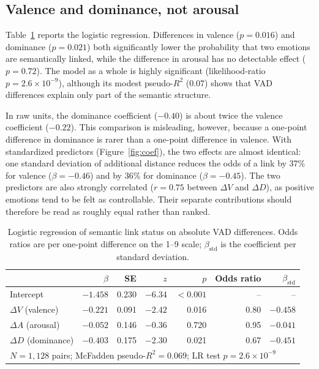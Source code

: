 \documentclass[11pt,a4paper]{article}
\newcommand{\dV}{\Delta V}
\newcommand{\dA}{\Delta A}
\newcommand{\dD}{\Delta D}
\begin{document}
\subsection{Valence and dominance, not arousal}

Table~\ref{tab:logit} reports the logistic regression. Differences in
valence ($p = 0.016$) and dominance ($p = 0.021$) both significantly lower
the probability that two emotions are semantically linked, while the
difference in arousal has no detectable effect ($p = 0.72$). The model as a
whole is highly significant (likelihood-ratio $p = 2.6 \times 10^{-9}$),
although its modest pseudo-$R^2$ (0.07) shows that VAD differences explain
only part of the semantic structure.

In raw units, the dominance coefficient ($-0.40$) is about twice the valence
coefficient ($-0.22$). This comparison is misleading, however, because a
one-point difference in dominance is rarer than a one-point difference in
valence. With standardized predictors (Figure~\ref{fig:coef}), the two
effects are almost identical: one standard deviation of additional distance
reduces the odds of a link by 37\% for valence ($\beta = -0.46$) and by
36\% for dominance ($\beta = -0.45$). The two predictors are also strongly
correlated ($r = 0.75$ between $\dV$ and $\dD$), as positive emotions tend to
be felt as controllable. Their separate contributions should therefore be
read as roughly equal rather than ranked.

\begin{table}[h]
  \centering
  \small
  \begin{tabular}{lrrrrrr}
    \toprule
    & $\beta$ & SE & $z$ & $p$ & Odds ratio & $\beta_{\text{std}}$ \\
    \midrule
    Intercept         & $-1.458$ & 0.230 & $-6.34$ & $<0.001$ & --    & --        \\
    $\dV$ (valence)   & $-0.221$ & 0.091 & $-2.42$ & 0.016    & 0.80  & $-0.458$  \\
    $\dA$ (arousal)   & $-0.052$ & 0.146 & $-0.36$ & 0.720    & 0.95  & $-0.041$  \\
    $\dD$ (dominance) & $-0.403$ & 0.175 & $-2.30$ & 0.021    & 0.67  & $-0.451$  \\
    \midrule
    \multicolumn{7}{l}{$N = 1{,}128$ pairs; McFadden pseudo-$R^2 = 0.069$;
    LR test $p = 2.6 \times 10^{-9}$} \\
    \bottomrule
  \end{tabular}
  \caption{Logistic regression of semantic link status on absolute VAD
  differences. Odds ratios are per one-point difference on the 1--9 scale;
  $\beta_{\text{std}}$ is the coefficient per standard deviation.}
  \label{tab:logit}
\end{table}
\end{document}

